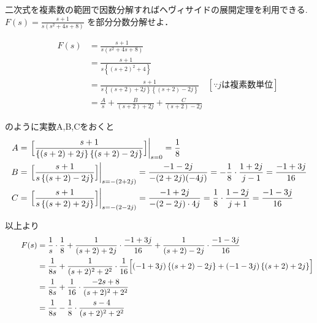 \documentclass[a4paper,12pt]{report}
\begin{document}
    二次式を複素数の範囲で因数分解すればヘヴィサイドの展開定理を利用できる.\\


\quad \(F(s) = \frac{s+1}{s\left(s^2+4s+8\right)} \) を部分分数分解せよ．

\begin{align*}
  \qquad F(s) &= \frac{s+1}{s \left(s^2+4s+8\right)} \\
      &= \frac{s+1}{s \left\{(s+2)^2+4\right\}} \\
      &= \frac{s+1}{s \left\{(s+2)+2j\right\}\left\{(s+2)-2j\right\}} \quad [\because j \text{は複素数単位}] \\
      &= \frac{A}{s} 
      + \frac{B}{(s+2)+2j}
      + \frac{C}{(s+2)-2j}
\end{align*}

\qquad のように実数A,B,Cをおくと\\

\begin{align*}
  A &= \left.\Bigl[\frac{s+1}{\left\{(s+2)+2j\right\}\left\{(s+2)-2j\right\}}\Bigr]\right|_{s=0} = \frac{1}{8} \\
  B &= \left.\Bigl[\frac{s+1}{s \left\{(s+2)-2j\right\}}\Bigr]\right|_{s=-(2+2j)}
    = \frac{-1-2j}{-(2+2j)(-4j)}
    = - \frac{1}{8} \cdot \frac{1+2j}{j-1}
    = \frac{-1+3j}{16}\\
  C &= \left.\Bigl[\frac{s+1}{s \left\{(s+2)+2j\right\}}\Bigr]\right|_{s=-(2-2j)}
  = \frac{-1+2j}{-(2-2j) \cdot 4j}
  = \frac{1}{8} \cdot \frac{1-2j}{j+1}
  = \frac{-1-3j}{16}\\
\end{align*}

\qquad 以上より\\

\begin{align*}
  \qquad F(s) &=\frac{1}{s} \cdot \frac{1}{8} 
              + \frac{1}{(s+2)+2j} \cdot \frac{-1+3j}{16}
              + \frac{1}{(s+2)-2j} \cdot \frac{-1-3j}{16} \\
              &=\frac{1}{8s} 
              + \frac{1}{(s+2)^2+2^2} \cdot \frac{1}{16}
              \Bigl[(-1+3j)\left\{(s+2)-2j\right\}
              + (-1-3j)\left\{(s+2)+2j\right\}\Bigr] \\
              &=\frac{1}{8s} 
              +\frac{1}{16} \cdot \frac{-2s+8}{(s+2)^2+2^2} \\
              &=\frac{1}{8s} 
              -\frac{1}{8} \cdot \frac{s-4}{(s+2)^2+2^2} \\
\end{align*}
\end{document}
